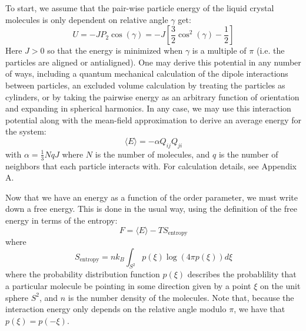 \documentclass[reqno]{article}
\begin{document}
  To start, we assume that the pair-wise particle energy of the liquid crystal
  molecules is only dependent on relative angle $\gamma$ get:
  \begin{equation} \label{eq:maier-saupe-pairwise}
    U = -J P_2 \cos(\gamma) = -J \left[ \frac32 \cos^2(\gamma) - \frac12 \right]
  \end{equation}
  Here $J > 0$ so that the energy is minimized when $\gamma$ is a multiple of
  $\pi$ (i.e. the particles are aligned or antialigned).
  One may derive this potential in any number of ways, including a quantum
  mechanical calculation of the dipole interactions between particles, an
  excluded volume calculation by treating the particles as cylinders, or by
  taking the pairwise energy as an arbitrary function of orientation and
  expanding in spherical harmonics.
  In any case, we may use this interaction potential along with the mean-field
  approximation to derive an average energy for the system:
  \begin{equation}
    \langle E \rangle
    =
    -\alpha Q_{ij} Q_{ji}
  \end{equation}
  with $\alpha = \frac13 N q J$ where $N$ is the number of molecules, and $q$ is
  the number of neighbors that each particle interacts with.
  For calculation details, see Appendix A.

  Now that we have an energy as a function of the order parameter, we must write
  down a free energy.
  This is done in the usual way, using the definition of the free energy in
  terms of the entropy:
  \begin{equation}
    F = \langle E \rangle - TS_\text{entropy}
  \end{equation}
  where
  \begin{equation}
    S_\text{entropy}
    =
    n k_B \int_{S^2} p(\xi) \log \left( 4 \pi p(\xi)\right) d\xi
  \end{equation}
  where the probability distribution function $p(\xi)$ describes the probablility
  that a particular molecule be pointing in some direction given by a point $\xi$ on
  the unit sphere $S^2$, and $n$ is the number density of the molecules.
  Note that, because the interaction energy only depends on the relative angle
  modulo $\pi$, we have that $p(\xi) = p(-\xi)$.
\end{document}
